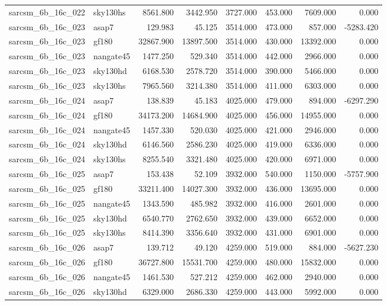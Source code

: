 \begin{tabular}{llrrrrrr}
sarcsm\_6b\_16c\_022 & sky130hs & 8561.800 & 3442.950 & 3727.000 & 453.000 & 7609.000 & 0.000 \\
sarcsm\_6b\_16c\_023 & asap7 & 129.983 & 45.125 & 3514.000 & 473.000 & 857.000 & -5283.420 \\
sarcsm\_6b\_16c\_023 & gf180 & 32867.900 & 13897.500 & 3514.000 & 430.000 & 13392.000 & 0.000 \\
sarcsm\_6b\_16c\_023 & nangate45 & 1477.250 & 529.340 & 3514.000 & 442.000 & 2966.000 & 0.000 \\
sarcsm\_6b\_16c\_023 & sky130hd & 6168.530 & 2578.720 & 3514.000 & 390.000 & 5466.000 & 0.000 \\
sarcsm\_6b\_16c\_023 & sky130hs & 7965.560 & 3214.380 & 3514.000 & 411.000 & 6303.000 & 0.000 \\
sarcsm\_6b\_16c\_024 & asap7 & 138.839 & 45.183 & 4025.000 & 479.000 & 894.000 & -6297.290 \\
sarcsm\_6b\_16c\_024 & gf180 & 34173.200 & 14684.900 & 4025.000 & 456.000 & 14955.000 & 0.000 \\
sarcsm\_6b\_16c\_024 & nangate45 & 1457.330 & 520.030 & 4025.000 & 421.000 & 2946.000 & 0.000 \\
sarcsm\_6b\_16c\_024 & sky130hd & 6146.560 & 2586.230 & 4025.000 & 419.000 & 6336.000 & 0.000 \\
sarcsm\_6b\_16c\_024 & sky130hs & 8255.540 & 3321.480 & 4025.000 & 420.000 & 6971.000 & 0.000 \\
sarcsm\_6b\_16c\_025 & asap7 & 153.438 & 52.109 & 3932.000 & 540.000 & 1150.000 & -5757.900 \\
sarcsm\_6b\_16c\_025 & gf180 & 33211.400 & 14027.300 & 3932.000 & 436.000 & 13695.000 & 0.000 \\
sarcsm\_6b\_16c\_025 & nangate45 & 1343.590 & 485.982 & 3932.000 & 416.000 & 2601.000 & 0.000 \\
sarcsm\_6b\_16c\_025 & sky130hd & 6540.770 & 2762.650 & 3932.000 & 439.000 & 6652.000 & 0.000 \\
sarcsm\_6b\_16c\_025 & sky130hs & 8414.390 & 3356.640 & 3932.000 & 431.000 & 6901.000 & 0.000 \\
sarcsm\_6b\_16c\_026 & asap7 & 139.712 & 49.120 & 4259.000 & 519.000 & 884.000 & -5627.230 \\
sarcsm\_6b\_16c\_026 & gf180 & 36727.800 & 15531.700 & 4259.000 & 480.000 & 15832.000 & 0.000 \\
sarcsm\_6b\_16c\_026 & nangate45 & 1461.530 & 527.212 & 4259.000 & 462.000 & 2940.000 & 0.000 \\
sarcsm\_6b\_16c\_026 & sky130hd & 6329.000 & 2686.330 & 4259.000 & 443.000 & 5992.000 & 0.000 \\

\end{tabular}
